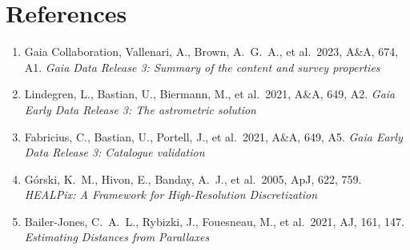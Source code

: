\section*{References}

\begin{enumerate}
\item Gaia Collaboration, Vallenari, A., Brown, A.~G.~A., et al.\ 2023, A\&A, 674, A1. \textit{Gaia Data Release 3: Summary of the content and survey properties}

\item Lindegren, L., Bastian, U., Biermann, M., et al.\ 2021, A\&A, 649, A2. \textit{Gaia Early Data Release 3: The astrometric solution}

\item Fabricius, C., Bastian, U., Portell, J., et al.\ 2021, A\&A, 649, A5. \textit{Gaia Early Data Release 3: Catalogue validation}

\item G\'orski, K.~M., Hivon, E., Banday, A.~J., et al.\ 2005, ApJ, 622, 759. \textit{HEALPix: A Framework for High-Resolution Discretization}

\item Bailer-Jones, C.~A.~L., Rybizki, J., Fouesneau, M., et al.\ 2021, AJ, 161, 147. \textit{Estimating Distances from Parallaxes}
\end{enumerate}
